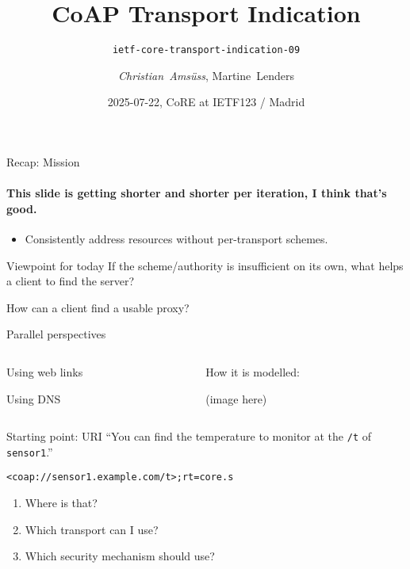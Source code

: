 

\title{CoAP Transport Indication}
\subtitle{\texttt{ietf-core-transport-indication-09}}
\author{\textit{Christian~Amsüss}, Martine~Lenders}
\date{2025-07-22, CoRE at IETF123 / Madrid}



\frame{\titlepage}

\begin{frame}{Recap: Mission}\framesubtitle{\footnotesize This slide is getting shorter and shorter per iteration, I think that's good.}\Large
    \begin{itemize}
        \item Consistently address resources without per-transport schemes.
    \end{itemize}
\end{frame}

\begin{frame}{Viewpoint for today}\Large
    If the scheme/authority is insufficient on its own, what helps a client to find the server?

    \vspace{2cm}

    How can a client find a usable proxy?
\end{frame}

\begin{frame}{Parallel perspectives}\Large
    \begin{columns}
        \begin{column}{0.7\textwidth}
            Using web links
           
            \vspace{2cm}

            Using DNS
        \end{column}
        \begin{column}{0.3\textwidth}
            How it is modelled:
            
            (image here)
        \end{column}
    \end{columns}
\end{frame}

\begin{frame}{Starting point: URI}\Large
    ``You can find the temperature to monitor at the \texttt{/t} of \texttt{sensor1}.''

    \vspace{1cm}

    \texttt{<coap://sensor1.example.com/t>;rt=core.s}

    \vspace{1cm}

    \begin{enumerate}
        \item Where is that?
        \item Which transport can I use?
        \item Which security mechanism should use?
    \end{enumerate}
\end{frame}

